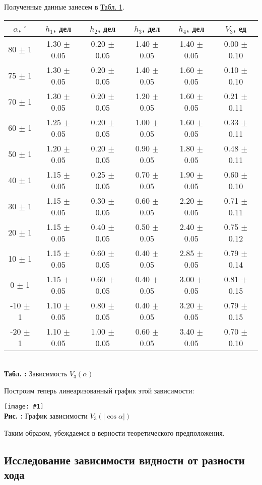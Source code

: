\documentclass[12pt,a4paper]{article}
\newcounter{picture}
\newcounter{tbl}
\newcommand{\embedeps}[3]{\begin{center}
		\texttt{[image: \#1]}
		\\\textbf{Рис. \thepicture:} #3
		\label{pic_\thepicture}
		\addtocounter{picture}{1}
\end{center}}
\newcommand{\embedtbl}[3]{\begin{center}
		\begin{tabular}{#1}
			#2
		\end{tabular}
		\\\textbf{Табл. \thetbl:} #3
		\label{tbl_\thetbl}
		\addtocounter{tbl}{1}
\end{center}}
\newcommand{\tblref}[1]{\hyperref[tbl_#1]{Табл. #1}}
\begin{document}
	Полученные данные занесем в \tblref{1}.
	
	\embedtbl{|c|c|c|c|c|c|}{
		\hline
		$\alpha$, $^\circ$ & $h_1$, дел & $h_2$, дел & $h_3$, дел & $h_4$, дел & $V_3$, ед
		\\\hline
		80 $\pm$ 1 & 1.30 $\pm$ 0.05 & 0.20 $\pm$ 0.05 & 1.40 $\pm$ 0.05 & 1.40 $\pm$ 0.05 & 0.00 $\pm$ 0.10
		\\\hline
		75 $\pm$ 1 & 1.30 $\pm$ 0.05 & 0.20 $\pm$ 0.05 & 1.40 $\pm$ 0.05 & 1.60 $\pm$ 0.05 & 0.10 $\pm$ 0.10
		\\\hline
		70 $\pm$ 1 & 1.30 $\pm$ 0.05 & 0.20 $\pm$ 0.05 & 1.20 $\pm$ 0.05 & 1.60 $\pm$ 0.05 & 0.21 $\pm$ 0.11
		\\\hline
		60 $\pm$ 1 & 1.25 $\pm$ 0.05 & 0.20 $\pm$ 0.05 & 1.00 $\pm$ 0.05 & 1.60 $\pm$ 0.05 & 0.33 $\pm$ 0.11
		\\\hline
		50 $\pm$ 1 & 1.20 $\pm$ 0.05 & 0.20 $\pm$ 0.05 & 0.90 $\pm$ 0.05 & 1.80 $\pm$ 0.05 & 0.48 $\pm$ 0.11
		\\\hline
		40 $\pm$ 1 & 1.15 $\pm$ 0.05 & 0.25 $\pm$ 0.05 & 0.70 $\pm$ 0.05 & 1.90 $\pm$ 0.05 & 0.60 $\pm$ 0.10
		\\\hline
		30 $\pm$ 1 & 1.15 $\pm$ 0.05 & 0.30 $\pm$ 0.05 & 0.60 $\pm$ 0.05 & 2.20 $\pm$ 0.05 & 0.71 $\pm$ 0.11
		\\\hline
		20 $\pm$ 1 & 1.15 $\pm$ 0.05 & 0.40 $\pm$ 0.05 & 0.50 $\pm$ 0.05 & 2.40 $\pm$ 0.05 & 0.75 $\pm$ 0.12
		\\\hline
		10 $\pm$ 1 & 1.15 $\pm$ 0.05 & 0.60 $\pm$ 0.05 & 0.40 $\pm$ 0.05 & 2.85 $\pm$ 0.05 & 0.79 $\pm$ 0.14
		\\\hline
		0 $\pm$ 1 & 1.15 $\pm$ 0.05 & 0.60 $\pm$ 0.05 & 0.40 $\pm$ 0.05 & 3.00 $\pm$ 0.05 & 0.81 $\pm$ 0.15
		\\\hline
		-10 $\pm$ 1 & 1.10 $\pm$ 0.05 & 0.80 $\pm$ 0.05 & 0.40 $\pm$ 0.05 & 3.20 $\pm$ 0.05 & 0.79 $\pm$ 0.15
		\\\hline
		-20 $\pm$ 1 & 1.10 $\pm$ 0.05 & 1.00 $\pm$ 0.05 & 0.60 $\pm$ 0.05 & 3.40 $\pm$ 0.05 & 0.70 $\pm$ 0.10
		\\\hline
	}{Зависимость $V_3(\alpha)$}

	Построим теперь линеаризованный график этой зависимости:
	
	\embedeps{PIC_8.eps}{0.75}{График зависимости $V_3(|\cos \alpha|)$}
	
	Таким образом, убеждаемся в верности теоретического предположения.
	
	\subsection{Исследование зависимости видности от разности хода}
	
\end{document}
